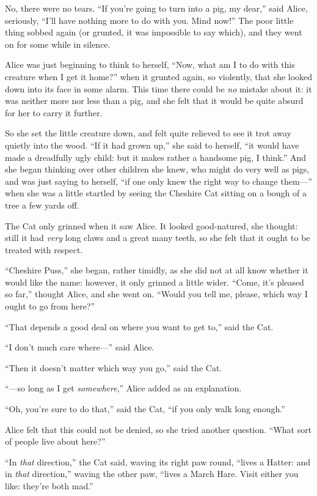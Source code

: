 \documentclass[book, 20pt]{extbook}
\begin{document}
No, there were no tears. ``If you're going to turn into a pig, my
dear,'' said Alice, seriously, ``I'll have nothing more to do with you.
Mind now!'' The poor little thing sobbed again (or grunted, it was
impossible to say which), and they went on for some while in silence.

Alice was just beginning to think to herself, ``Now, what am I to do
with this creature when I get it home?'' when it grunted again, so
violently, that she looked down into its face in some alarm. This time
there could be \emph{no} mistake about it: it was neither more nor less
than a pig, and she felt that it would be quite absurd for her to carry
it further.

So she set the little creature down, and felt quite relieved to see it
trot away quietly into the wood. ``If it had grown up,'' she said to
herself, ``it would have made a dreadfully ugly child: but it makes
rather a handsome pig, I think.'' And she began thinking over other
children she knew, who might do very well as pigs, and was just saying
to herself, ``if one only knew the right way to change them---'' when
she was a little startled by seeing the Cheshire Cat sitting on a bough
of a tree a few yards off.

The Cat only grinned when it saw Alice. It looked good-natured, she
thought: still it had \emph{very} long claws and a great many teeth, so
she felt that it ought to be treated with respect.

``Cheshire Puss,'' she began, rather timidly, as she did not at all know
whether it would like the name: however, it only grinned a little wider.
``Come, it's pleased so far,'' thought Alice, and she went on. ``Would
you tell me, please, which way I ought to go from here?''

``That depends a good deal on where you want to get to,'' said the Cat.

``I don't much care where---'' said Alice.

``Then it doesn't matter which way you go,'' said the Cat.

``---so long as I get \emph{somewhere},'' Alice added as an explanation.

``Oh, you're sure to do that,'' said the Cat, ``if you only walk long
enough.''

Alice felt that this could not be denied, so she tried another question.
``What sort of people live about here?''

``In \emph{that} direction,'' the Cat said, waving its right paw round,
``lives a Hatter: and in \emph{that} direction,'' waving the other paw,
``lives a March Hare. Visit either you like: they're both mad.''
\end{document}

